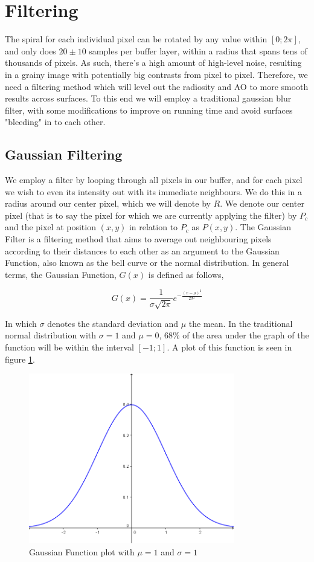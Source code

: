 \section{Filtering}
The spiral for each individual pixel can be rotated by any value within $[0;2\pi]$, and only does $20\pm10$ samples per buffer layer, within a radius that spans tens of thousands of pixels. As such, there's a high amount of high-level noise, resulting in a grainy image with potentially big contrasts from pixel to pixel. Therefore, we need a filtering method which will level out the radiosity and AO to more smooth results across surfaces. To this end we will employ a traditional gaussian blur filter, with some modifications to improve on running time and avoid surfaces "bleeding" in to each other.

\subsection{Gaussian Filtering}
\label{section-gauss}
We employ a filter by looping through all pixels in our buffer, and for each pixel we wish to even its intensity out with its immediate neighbours. We do this in a radius around our center pixel, which we will denote by $R$. We denote our center pixel (that is to say the pixel for which we are currently applying the filter) by $P_c$ and the pixel at position $(x,y)$ in relation to $P_c$ as $P(x,y)$.
The Gaussian Filter is a filtering method that aims to average out neighbouring pixels according to their distances to each other as an argument to the Gaussian Function, also known as the bell curve or the normal distribution. In general terms, the Gaussian Function, $G(x)$ is defined as follows,

$$G(x) = \frac{1}{\sigma \sqrt{2\pi}} e ^ {-\frac{(x - \mu)^2}{2\sigma^2}}$$

In which $\sigma$ denotes the standard deviation and $\mu$ the mean. In the traditional normal distribution with $\sigma = 1$ and $\mu = 0$, $68\%$ of the area under the graph of the function will be within the interval $[-1;1]$. A plot of this function is seen in figure \ref{fig-gauss}.

\begin{figure}[!ht]
  	\centering
  	\includegraphics[width=0.8\textwidth]{img/gauss}
    \caption{Gaussian Function plot with $\mu = 1$ and $\sigma = 1$}
    \label{fig-gauss}
\end{figure}

